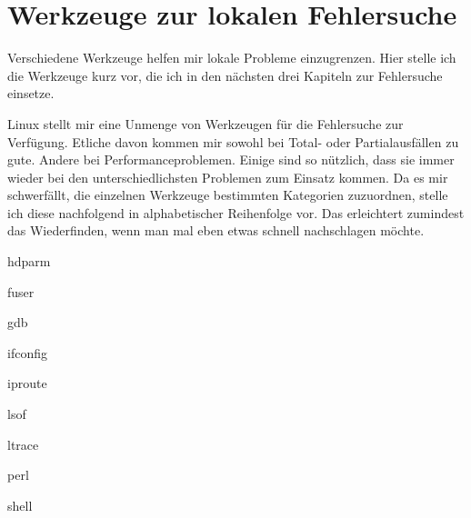 \chapter{Werkzeuge zur lokalen Fehlersuche}
\label{cha:lokal-werkzeuge}

\begin{abstractsec}
  Verschiedene Werkzeuge helfen mir lokale Probleme einzugrenzen. Hier stelle
  ich die Werkzeuge kurz vor, die ich in den nächsten drei Kapiteln zur
  Fehlersuche einsetze.
\end{abstractsec}

\begin{normaltext}
  Linux stellt mir eine Unmenge von Werkzeugen für die Fehlersuche zur
  Verfügung. Etliche davon kommen mir sowohl bei Total- oder Partialausfällen
  zu gute. Andere bei Performanceproblemen. Einige sind so nützlich, dass sie
  immer wieder bei den unterschiedlichsten Problemen zum Einsatz kommen. Da
  es mir schwerfällt, die einzelnen Werkzeuge bestimmten Kategorien
  zuzuordnen, stelle ich diese nachfolgend in alphabetischer Reihenfolge vor.
  Das erleichtert zumindest das Wiederfinden, wenn man mal eben etwas schnell
  nachschlagen möchte.
\end{normaltext}

\begin{notes}
\item hdparm
\item fuser
\item gdb
\item ifconfig
\item iproute
\item lsof
\item ltrace
\item perl
\item shell
\end{notes}

